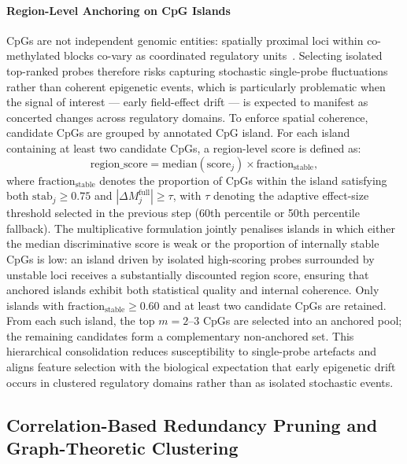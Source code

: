 \paragraph{Region-Level Anchoring on CpG Islands}

CpGs are not independent genomic entities: spatially 
proximal loci within co-methylated blocks co-vary as 
coordinated regulatory 
units~\cite{Hansen2011}. Selecting isolated top-ranked 
probes therefore risks capturing stochastic single-probe 
fluctuations rather than coherent epigenetic events, 
which is particularly problematic when the signal of 
interest — early field-effect drift — is expected to 
manifest as concerted changes across regulatory domains.
To enforce spatial coherence, candidate CpGs are grouped 
by annotated CpG island. For each island containing at 
least two candidate CpGs, a region-level score is defined 
as:
\begin{equation}
\mathrm{region\_score}
=
\mathrm{median}(\mathrm{score}_j)
\times
\mathrm{fraction}_{\mathrm{stable}},
\end{equation}
where $\mathrm{fraction}_{\mathrm{stable}}$ denotes the proportion 
of CpGs within the island satisfying both 
$\mathrm{stab}_j \geq 0.75$ and 
$|\Delta M_{j}^{\mathrm{full}}| \geq \tau$, 
with $\tau$ denoting the adaptive effect-size threshold 
selected in the previous step (60th percentile or 50th percentile fallback). 
The multiplicative formulation jointly penalises islands in which 
either the median discriminative score is weak or the proportion of 
internally stable CpGs is low: an island driven by isolated 
high-scoring probes surrounded by unstable loci receives a 
substantially discounted region score, ensuring that anchored 
islands exhibit both statistical quality and internal coherence. 
Only islands with $\mathrm{fraction}_{\mathrm{stable}} \geq 0.60$ and at 
least two candidate CpGs are retained. From each such 
island, the top $m = 2$--$3$ CpGs are selected into an 
anchored pool; the remaining candidates form a 
complementary non-anchored set. This hierarchical 
consolidation reduces susceptibility to single-probe 
artefacts and aligns feature selection with the biological 
expectation that early epigenetic drift occurs in clustered 
regulatory domains rather than as isolated stochastic 
events.

\subsection{Correlation-Based Redundancy Pruning and Graph-Theoretic Clustering}
\label{subsec:fs_corr_pruning}

